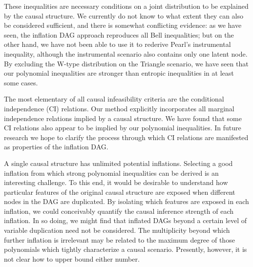 These inequalities are necessary conditions on a joint distribution to be explained by the causal structure. We currently do not know to what extent they can also be considered sufficient, and there is somewhat conflicting evidence: as we have seen, the inflation DAG approach reproduces all Bell inequalities; but on the other hand, we have not been able to use it to rederive Pearl's instrumental inequality, although the instrumental scenario also contains only one latent node. By excluding the W-type distribution on the Triangle scenario, we have seen that our polynomial inequalities are stronger than entropic inequalities in at least some cases.

The most elementary of all causal infeasibility criteria are the conditional independence (CI) relations. Our method explicitly incorporates all marginal independence relations implied by a causal structure. We have found that some CI relations also appear to be implied by our polynomial inequalities. In future research we hope to clarify the process through which CI relations are manifested as properties of the inflation DAG.

A single causal structure has unlimited potential inflations. Selecting a good inflation from which strong polynomial inequalities can be derived is an interesting challenge. To this end, it would be desirable to understand how particular features of the original causal structure are exposed when different nodes in the DAG are duplicated. By isolating which features are exposed in each inflation, we could conceivably quantify the causal inference strength of each inflation. In so doing, we might find that inflated DAGs beyond a certain level of variable duplication need not be considered. The multiplicity beyond which further inflation is irrelevant may be related to the maximum degree of those polynomials which tightly characterize a causal scenario. Presently, however, it is not clear how to upper bound either number.


